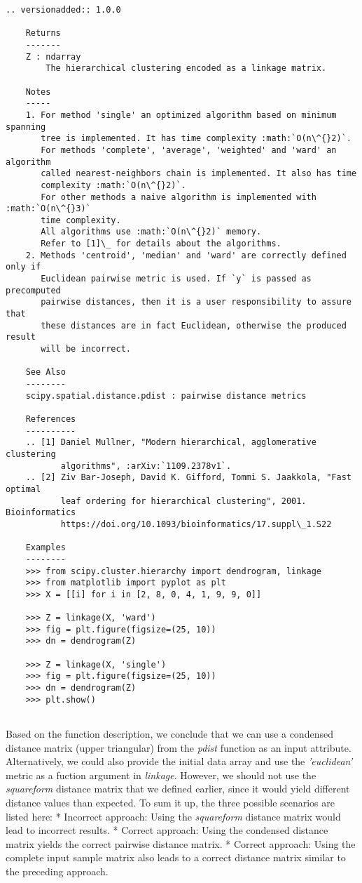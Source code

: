 \documentclass[11pt]{article}
\begin{document}
\begin{Verbatim}[commandchars=\\\{\}]
        .. versionadded:: 1.0.0
    
    Returns
    -------
    Z : ndarray
        The hierarchical clustering encoded as a linkage matrix.
    
    Notes
    -----
    1. For method 'single' an optimized algorithm based on minimum spanning
       tree is implemented. It has time complexity :math:`O(n\^{}2)`.
       For methods 'complete', 'average', 'weighted' and 'ward' an algorithm
       called nearest-neighbors chain is implemented. It also has time
       complexity :math:`O(n\^{}2)`.
       For other methods a naive algorithm is implemented with :math:`O(n\^{}3)`
       time complexity.
       All algorithms use :math:`O(n\^{}2)` memory.
       Refer to [1]\_ for details about the algorithms.
    2. Methods 'centroid', 'median' and 'ward' are correctly defined only if
       Euclidean pairwise metric is used. If `y` is passed as precomputed
       pairwise distances, then it is a user responsibility to assure that
       these distances are in fact Euclidean, otherwise the produced result
       will be incorrect.
    
    See Also
    --------
    scipy.spatial.distance.pdist : pairwise distance metrics
    
    References
    ----------
    .. [1] Daniel Mullner, "Modern hierarchical, agglomerative clustering
           algorithms", :arXiv:`1109.2378v1`.
    .. [2] Ziv Bar-Joseph, David K. Gifford, Tommi S. Jaakkola, "Fast optimal
           leaf ordering for hierarchical clustering", 2001. Bioinformatics
           https://doi.org/10.1093/bioinformatics/17.suppl\_1.S22
    
    Examples
    --------
    >>> from scipy.cluster.hierarchy import dendrogram, linkage
    >>> from matplotlib import pyplot as plt
    >>> X = [[i] for i in [2, 8, 0, 4, 1, 9, 9, 0]]
    
    >>> Z = linkage(X, 'ward')
    >>> fig = plt.figure(figsize=(25, 10))
    >>> dn = dendrogram(Z)
    
    >>> Z = linkage(X, 'single')
    >>> fig = plt.figure(figsize=(25, 10))
    >>> dn = dendrogram(Z)
    >>> plt.show()


    \end{Verbatim}

    Based on the function description, we conclude that we can use a
condensed distance matrix (upper triangular) from the \emph{pdist}
function as an input attribute. Alternatively, we could also provide the
initial data array and use the \emph{'euclidean'} metric as a fuction
argument in \emph{linkage}. However, we should not use the
\emph{squareform} distance matrix that we defined earlier, since it
would yield different distance values than expected. To sum it up, the
three possible scenarios are listed here: * Incorrect approach: Using
the \emph{squareform} distance matrix would lead to incorrect results. *
Correct approach: Using the condensed distance matrix yields the correct
pairwise distance matrix. * Correct approach: Using the complete input
sample matrix also leads to a correct distance matrix similar to the
preceding approach.
\end{document}
